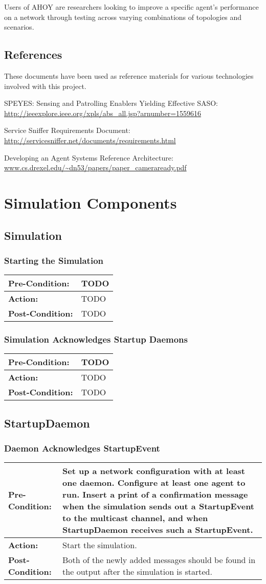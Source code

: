 \documentclass[titlepage]{article}
\renewenvironment{itemize*}
    {\begin{itemize}
        \setlength{\itemsep}{0pt}%
        \setlength{\parskip}{0pt}%
        \setlength{\partopsep}{0pt}%
        \setlength{\topsep}{0pt}}%
    {\end{itemize}}
\newcommand{\testcase}[3]{
    \begin{center}
    \begin{tabular}{| l | p{0.7\textwidth}|}
        \hline
        \rowcolor[gray]{0.8}\textbf{Pre-Condition:} & #1 \\ \hline
        \textbf{Action:} & #2 \\ \hline
        \rowcolor[gray]{0.8}\textbf{Post-Condition:} & #3 \\ \hline
    \end{tabular}
    \end{center}
}
\begin{document}
Users of AHOY are researchers looking to improve a specific agent's performance on a network through testing across varying combinations of topologies and scenarios.

\subsection{References%
  \label{references}%
}

These documents have been used as reference materials for various technologies involved with this project.
%
\begin{itemize*}
	\item SPEYES: Sensing and Patrolling Enablers Yielding Effective SASO: \url{http://ieeexplore.ieee.org/xpls/abs\_all.jsp?arnumber=1559616}
	\item Service Sniffer Requirements Document: \url{http://servicesniffer.net/documents/requirements.html}
    \item Developing an Agent Systems Reference Architecture: \url{www.cs.drexel.edu/~dn53/papers/paper\_cameraready.pdf}
\end{itemize*}

\section{Simulation Components}
\subsection{Simulation}
\subsubsection{Starting the Simulation}

\testcase{TODO}{TODO}{TODO}

\subsubsection{Simulation Acknowledges Startup Daemons}

\testcase{TODO}{TODO}{TODO}

\subsection{StartupDaemon}
\subsubsection{Daemon Acknowledges StartupEvent}
\testcase{Set up a network configuration with at least one daemon.  Configure at least one agent to run.  Insert a print of a confirmation message when the simulation sends out a StartupEvent to the multicast channel, and when StartupDaemon receives such a StartupEvent.}{Start the simulation.}{Both of the newly added messages should be found in the output after the simulation is started.}
\end{document}

